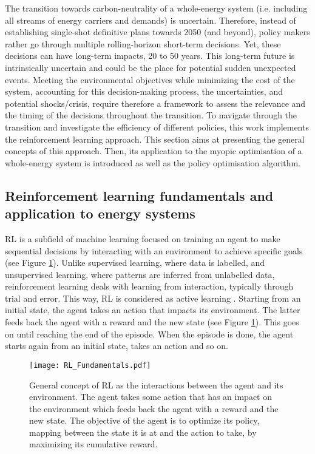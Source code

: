 The transition towards carbon-neutrality of a whole-energy system (i.e. including all streams of energy carriers and demands) is uncertain. Therefore, instead of establishing single-shot definitive plans towards 2050 (and beyond), policy makers rather go through multiple rolling-horizon short-term decisions. Yet, these decisions can have long-term impacts, 20 to 50 years. This long-term future is intrinsically uncertain and could be the place for potential sudden unexpected events. Meeting the environmental objectives while minimizing the cost of the system, accounting for this decision-making process, the uncertainties, and potential shocks/crisis, require therefore a framework to assess the relevance and the timing of the decisions throughout the transition. To navigate through the transition and investigate the efficiency of different policies, this work implements the reinforcement learning approach. This section aims at presenting the general concepts of this approach. Then, its application to the myopic optimisation of a whole-energy system is introduced as well as the policy optimisation algorithm. 

\subsection{Reinforcement learning fundamentals and application to energy systems}
\label{subsec:meth_RL_fundamentals}

\Gls{RL} is a subfield of machine learning focused on training an agent to make sequential decisions by interacting with an environment to achieve specific goals (see Figure \ref{fig:RL_Fundamentals}). Unlike supervised learning, where data is labelled, and unsupervised learning, where patterns are inferred from unlabelled data, reinforcement learning deals with learning from interaction, typically through trial and error. This way, \gls{RL} is considered as active learning \cite{cao2020reinforcement}. Starting from an initial state, the agent takes an action that impacts its environment. The latter feeds back the agent with a reward and the new state (see Figure \ref{fig:RL_Fundamentals}). This goes on until reaching the end of the episode. When the episode is done, the agent starts again from an initial state, takes an action and so on. 

\begin{figure}[!htbp]
\centering
\texttt{[image: RL\_Fundamentals.pdf]}
\caption{General concept of \acrfull{RL} as the interactions between the agent and its environment. The agent takes some action that has an impact on the environment which feeds back the agent with a reward and the new state. The objective of the agent is to optimize its policy, \ie mapping between the state it is at and the action to take, by maximizing its cumulative reward.}
\label{fig:RL_Fundamentals}
\end{figure}

